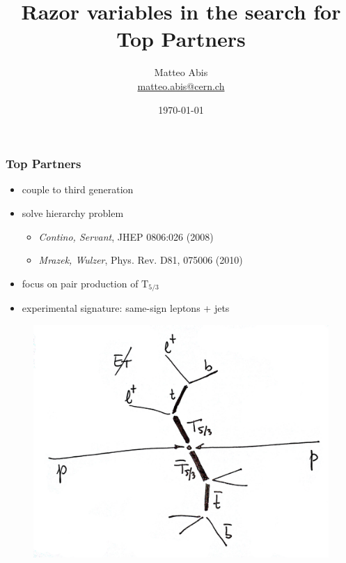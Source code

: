 \documentclass[ukenglish]{beamer}
\title[Razor for Top Partners]{Razor variables in the search for Top
Partners}
\author{Matteo Abis\\
\url{matteo.abis@cern.ch}}
\institute{Università di Padova and INFN}
\date{\today}
\begin{document}
\begingroup
{}
\begin{frame}
  \titlepage
\end{frame}
\endgroup
 
\begin{frame}
    \frametitle{Top Partners}
    \begin{itemize}
        \item couple to third generation
        \item solve hierarchy problem
            \begin{itemize}
                \item \emph{Contino, Servant}, JHEP 0806:026 (2008)
                \item \emph{Mrazek, Wulzer}, Phys. Rev. D81, 075006 (2010)
            \end{itemize}
        \item focus on pair production of $\mathrm{T}_{5/3}$
        \item experimental signature: same-sign leptons + jets
    \end{itemize}
    \begin{figure}[h]
        \centering
        \includegraphics[height=.5\textheight]{toppartner_decay_top.eps}
    \end{figure}
\end{frame}
\end{document}
